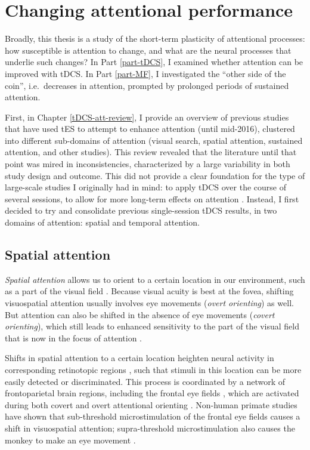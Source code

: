 \documentclass[11pt,]{memoir}
\begin{document}
\hypertarget{changing-attentional-performance}{%
\section{Changing attentional performance}\label{changing-attentional-performance}}

Broadly, this thesis is a study of the short-term plasticity of attentional processes: how susceptible is attention to change, and what are the neural processes that underlie such changes? In Part \ref{part-tDCS}, I examined whether attention can be improved with tDCS. In Part \ref{part-MF}, I investigated the ``other side of the coin'', i.e.~decreases in attention, prompted by prolonged periods of sustained attention.

First, in Chapter \ref{tDCS-att-review}, I provide an overview of previous studies that have used tES to attempt to enhance attention (until mid-2016), clustered into different sub-domains of attention (visual search, spatial attention, sustained attention, and other studies). This review revealed that the literature until that point was mired in inconsistencies, characterized by a large variability in both study design and outcome. This did not provide a clear foundation for the type of large-scale studies I originally had in mind: to apply tDCS over the course of several sessions, to allow for more long-term effects on attention \autocite[c.f.][]{Talsma2017}. Instead, I first decided to try and consolidate previous single-session tDCS results, in two domains of attention: spatial and temporal attention.

\hypertarget{spatial-attention}{%
\subsection{Spatial attention}\label{spatial-attention}}

\emph{Spatial attention} allows us to orient to a certain location in our environment, such as a part of the visual field \autocite{Wright2008}. Because visual acuity is best at the fovea, shifting visuospatial attention usually involves eye movements (\emph{overt orienting}) as well. But attention can also be shifted in the absence of eye movements (\emph{covert orienting}), which still leads to enhanced sensitivity to the part of the visual field that is now in the focus of attention \autocite{Carrasco2011}.

Shifts in spatial attention to a certain location heighten neural activity in corresponding retinotopic regions \autocites{Desimone1995}{Tootell1998}{Ungerleider1999}{Worden2000}, such that stimuli in this location can be more easily detected or discriminated. This process is coordinated by a network of frontoparietal brain regions, including the frontal eye fields \autocite{Corbetta2002}, which are activated during both covert and overt attentional orienting \autocites{Grosbras2005}{Nobre2000}. Non-human primate studies have shown that sub-threshold microstimulation of the frontal eye fields causes a shift in visuospatial attention; supra-threshold microstimulation also causes the monkey to make an eye movement \autocite{Moore2001}.
\end{document}
